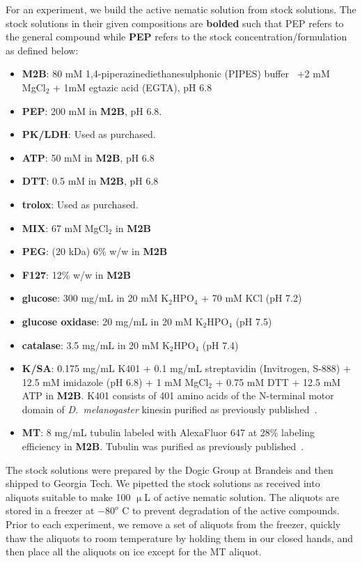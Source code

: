 For an experiment, we build the active nematic solution from stock solutions.
The stock solutions in their given compositions are {\bf bolded} such that PEP refers to the general compound while {\bf PEP} refers to the stock concentration/formulation as defined below:
\begin{itemize}
  \item[]{\bf M2B}: 80 mM 1,4-piperazinediethanesulphonic (PIPES) buffer~\cite{RN243} +2 mM MgCl$_2$ + 1mM egtazic acid (EGTA), pH 6.8
  \item[]{\bf PEP}: 200 mM in {\bf M2B}, pH 6.8.
  \item[]{\bf PK/LDH}: Used as purchased.
  \item[]{\bf ATP}: 50 mM in {\bf M2B}, pH 6.8
  \item[]{\bf DTT}: 0.5 mM in {\bf M2B}, pH 6.8
  \item[]{\bf trolox}: Used as purchased.
  \item[]{\bf MIX}: 67 mM MgCl$_2$ in {\bf M2B}
  \item[]{\bf PEG}: (20 kDa) 6\% w/w in {\bf M2B}
  \item[]{\bf F127}: 12\% w/w in {\bf M2B}
  \item[]{\bf glucose}: 300 mg/mL in 20 mM K$_2$HPO$_4$ + 70 mM KCl (pH 7.2)
  \item[]{\bf glucose oxidase}: 20 mg/mL in 20 mM K$_2$HPO$_4$ (pH 7.5)
  \item[]{\bf catalase}: 3.5 mg/mL in 20 mM K$_2$HPO$_4$ (pH 7.4)
  \item[]{\bf K/SA}: 0.175 mg/mL K401 + 0.1 mg/mL streptavidin (Invitrogen, S-888) + 12.5 mM imidazole (pH 6.8) + 1 mM MgCl$_2$ + 0.75 mM DTT + 12.5 mM ATP in {\bf M2B}. K401 consists of 401 amino acids of the N-terminal motor domain of \emph{D.~melanogaster} kinesin purified as previously published~\cite{RN3}.
  \item[]{\bf MT}: 8 mg/mL tubulin labeled with AlexaFluor 647 at 28\% labeling efficiency in {\bf M2B}. Tubulin was purified as previously published~\cite{RN243}.
\end{itemize}
The stock solutions were prepared by the Dogic Group at Brandeis and then shipped to Georgia Tech.
We pipetted the stock solutions as received into aliquots suitable to make 100 $\upmu$L of active nematic solution.
The aliquots are stored in a freezer at $-80^o$ C to prevent degradation of the active compounds.
Prior to each experiment, we remove a set of aliquots from the freezer, quickly thaw the aliquots to room temperature by holding them in our closed hands, and then place all the aliquots on ice except for the MT aliquot.
